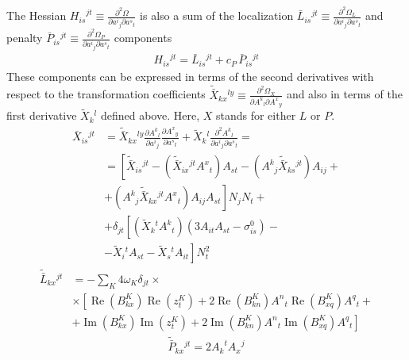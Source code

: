 \documentclass[aps,prl,reprint,amsmath,amssymb]{revtex4-1}
\begin{document}
The Hessian ${H_{is}}^{jt} \equiv \frac{\partial^2 \Omega}{\partial {a^i}_j \partial{a^s}_t}$ is also a sum of the localization $\bar{L}{_{is}}^{jt} \equiv \frac{\partial^2 \Omega_L}{\partial {a^i}_j \partial{a^s}_t}$ and penalty $\bar{P}{_{is}}^{jt} \equiv \frac{\partial^2 \Omega_P}{\partial {a^i}_j \partial{a^s}_t}$ components
%
\begin{equation} \label{eq:hessian}
\begin{split}
H{_{is}}^{jt} = \bar{L}{_{is}}^{jt} + c_P\, \bar{P}{_{is}}^{jt}
\end{split}
\end{equation}
%
These components can be expressed in terms of the second derivatives with respect to the transformation coefficients $\tilde{\bar{X}}{_{kx}}^{ly} \equiv \frac{\partial^2 \Omega_X}{\partial {A^k}_l \partial {A^x}_y}$ and also in terms of the first derivative $\tilde{X}{_k}^l$ defined above. Here, $X$ stands for either $L$ or $P$. %
%
\begin{equation} \label{eq:hessian-convert}
\begin{split}
\bar{X}{_{is}}^{jt} &= \tilde{\bar{X}}{_{kx}}^{ly} \frac{\partial {A^k}_l}{\partial {a^i}_j} \frac{\partial {A^x}_y}{\partial {a^s}_t} + \tilde{X}{_k}^l \frac{\partial^2 {A^k}_l}{\partial {a^i}_j \partial{a^s}_t} = \\
&= \left[ \tilde{\bar{X}}{_{is}}^{jt} - \left(\tilde{\bar{X}}{_{ix}}^{jt} {A^x}_t \right) A_{st} - \left({A^k}_j \tilde{\bar{X}}{_{ks}}^{jt} \right) A_{ij} + \right.\\
&\left. + \left({A^k}_j \tilde{\bar{X}}{_{kx}}^{jt} {A^x}_t\right) A_{ij} A_{st} \right] N_j N_t + \\
&+ \delta_{jt} \left[ \left(\tilde{X}{_k}^t {A^k}_t \right) \left( 3 A_{it} A_{st} - \sigma^0_{is} \right) - \right.\\
&\left.  -\tilde{X}{_i}^t A_{st} - \tilde{X}{_s}^t A_{it} \right] N_{t}^2
\end{split}
\end{equation}
%
%
\begin{equation} \label{eq:hessian-loc}
\begin{split}
\tilde{\bar{L}}{_{kx}}^{jt} &= - \sum_K {4 \omega_K}  \delta_{jt} \times \\ 
&\times \left[  \operatorname{Re}(B^{K}_{kx}) \operatorname{Re}(z_{t}^{K}) + 2 \operatorname{Re}(B^{K}_{kn}){A^{n}}_{t} \operatorname{Re}(B^{K}_{xq}){A^{q}}_{t} +  \right. \\
&\left. + \operatorname{Im}(B^{K}_{kx}) \operatorname{Im}(z_{t}^{K}) + 2 \operatorname{Im}(B^{K}_{kn}){A^{n}}_{t} \operatorname{Im}(B^{K}_{xq}){A^{q}}_{t}  \right]
\end{split}
\end{equation}
%
%
\begin{equation} \label{eq:hessian-pen}
\begin{split}
\tilde{\bar{P}}{_{kx}}^{jt} = 2 {A_k}^t {A_x}^j
\end{split}
\end{equation}
%
\end{document}
